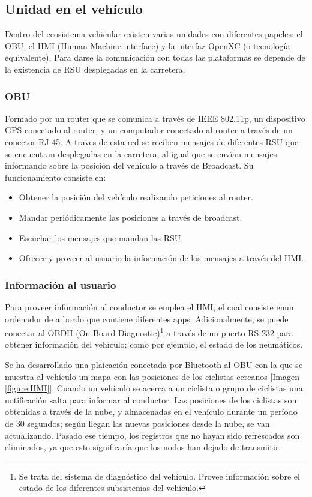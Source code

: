 \subsection{Unidad en el vehículo}
Dentro del ecosistema vehicular existen varias unidades con diferentes papeles: el OBU, el HMI (Human-Machine interface) y la interfaz OpenXC (o tecnología equivalente). Para darse la comunicación con todas las plataformas se depende de la existencia de RSU desplegadas en la carretera.

	\subsubsection{OBU}
	Formado por un router que se comunica a través de IEEE 802.11p, un dispositivo GPS conectado al router, y un computador conectado al router a través de un conector RJ-45. A traves de esta red se reciben mensajes de diferentes RSU que se encuentran desplegadas en la carretera, al igual que se envían mensajes informando sobre la posición del vehículo a través de Broadcast. Su funcionamiento consiste en:
	\begin{itemize}
		\item Obtener la posición del vehículo realizando peticiones al router.
		\item Mandar periódicamente las posiciones a través de broadcast.
		\item Escuchar los mensajes que mandan las RSU.
		\item Ofrecer y proveer al usuario la información de los mensajes a través del HMI.
	\end{itemize}
	
	\subsubsection{Información al usuario}
	Para proveer información al conductor se emplea el HMI, el cual consiste enun ordenador de a bordo que contiene diferentes apps. Adicionalmente, se puede conectar al OBDII (On-Board Diagnostic)\footnote{Se trata del sistema de diagnóstico del vehículo. Provee información sobre el estado de los diferentes subsistemas del vehículo.} a través de un puerto RS 232 para obtener información del vehículo; como por ejemplo, el estado de los neumáticos.
	
	Se ha desarrollado una plaicación conectada por Bluetooth al OBU con la que se muestra al vehículo un mapa con las posiciones de los ciclistas cercanos [Imagen \ref{figure:HMI}]. Cuando un vehículo se acerca a un ciclista o grupo de ciclistas una notificación salta para informar al conductor. Las posiciones de los ciclistas son obtenidas a través de la nube, y almacenadas en el vehículo durante un período de 30 segundos; según llegan las nuevas posiciones desde la nube, se van actualizando. Pasado ese tiempo, los registros que no hayan sido refrescados son eliminados, ya que esto significaría que los nodos han dejado de transmitir.
	
